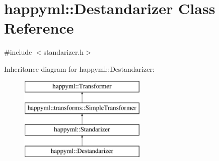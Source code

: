 \hypertarget{classhappyml_1_1Destandarizer}{}\section{happyml\+:\+:Destandarizer Class Reference}
\label{classhappyml_1_1Destandarizer}


{\ttfamily \#include $<$standarizer.\+h$>$}

Inheritance diagram for happyml\+:\+:Destandarizer\+:\begin{figure}[H]
\begin{center}
\leavevmode
\includegraphics[height=4.000000cm]{classhappyml_1_1Destandarizer}
\end{center}
\end{figure}
